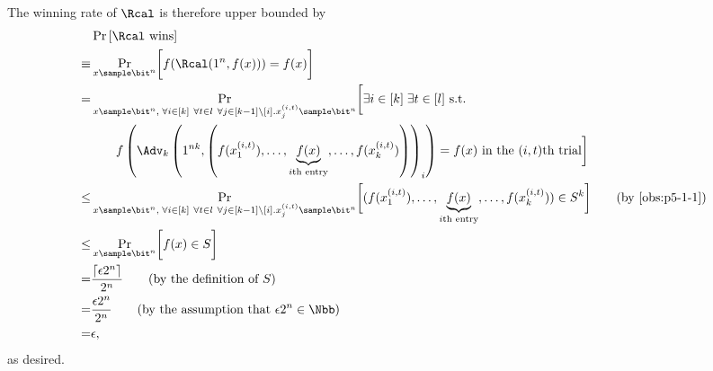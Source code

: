 \begin{answer}[i]
    The winning rate of $\Rcal$ is therefore upper bounded by
    \begin{align*}
        &\Pr\left[ \Rcal \textrm{ wins} \right] \\
        \equiv& \Pr_{x\sample\bit^n}\biggl[ f(\Rcal(1^n, f(x)))=f(x) \biggr] \\
        =&  \Pr_{x\sample\bit^n,\; \forall i\in[k]\ \forall t\in l\ \forall j\in [k-1]\setminus [i]. x_j^{(i,t)}\sample\bit^{n}} \biggl[\exists i\in[k]\; \exists t\in[l] \textrm{ s.t.}\biggr.\\
        &\qquad  \biggl. f\left(\Adv_k\left(1^{nk}, \left(f(x_1^{(i,t)}),\ldots,\underbrace{f(x)}_{i\textrm{th entry}},\ldots,f(x_{k}^{(i,t)})\right)\right)_i\right)=f(x) \textrm{ in the $(i,t)$th trial} \biggr] \\
        \le&  \Pr_{x\sample\bit^n,\; \forall i\in[k]\ \forall t\in l\ \forall j\in [k-1]\setminus [i]. x_j^{(i,t)}\sample\bit^{n}} \biggl[ (f(x_1^{(i,t)}),\ldots,\underbrace{f(x)}_{i\textrm{th entry}},\ldots,f(x_{k}^{(i,t)}))\in S^k \biggr] \qquad  (\textrm{by \autoref{obs:p5-1-1}})\\
        \le&  \Pr_{x\sample\bit^n} \biggl[ f(x)\in S \biggr]\\
        =& \frac{\lceil \epsilon 2^n\rceil}{2^n} \qquad \textrm{(by the definition of $S$)}\\
        =&  \frac{\epsilon 2^n}{2^n} \qquad \textrm{(by the assumption that $\epsilon 2^n\in\Nbb$)}\\
        =& \epsilon,
    \end{align*}
    as desired.
    
\end{answer}



























